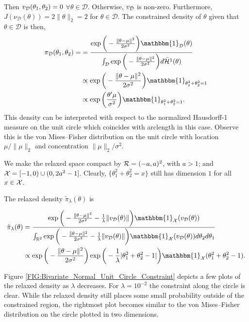 \documentclass[10pt,fleqn]{article} \pdfoutput=1
\DeclareMathOperator{\1}{\mathbbm{1}} \DeclareMathOperator{\bigO}{\mc O}
\begin{document}
Then $v_{\mathcal{D}}(\theta_1,\theta_2) = 0$ $\forall
\theta\in\mathcal{D}$. Otherwise, $v_{\mathcal{D}}$ is non-zero.  Furthermore,
$J(\nu_\mathcal{D}(\theta)) =
2\|\theta\|_2 = 2$ for $\theta\in\mathcal{D}.$ The constrained
density of $\theta$ given that $\theta\in \mathcal{D}$ is then,
\begin{align*} \pi_\mathcal{D}(\theta_1,\theta_2)=
& =
\frac{\exp\bigg(-\frac{\|\theta-\mu\|^2}{2\sigma^2}\bigg)\mathbbm{1}_\mathcal{D}(\theta)}{\int_\mathcal{D}
\exp\bigg(-\frac{\|\theta-\mu\|^2}{2\sigma^2}\bigg)d\bar{\mathcal{H}}^{1}(\theta)
}                                                              \\
& \propto \exp\bigg(-\frac{\|\theta-\mu\|^2}{2\sigma^2}\bigg)
\mathbbm{1}_{\theta_1^2 + \theta_2^2 = 1}                      \\ &\propto \exp\bigg(
\frac{\theta'\mu}{\sigma^2}\bigg) \mathbbm{1}_{\theta_1^2 + \theta_2^2
= 1}
.\end{align*} This density can be interpreted with respect to the normalized
Hausdorff-1 measure on the unit circle which coincides with arclength in
this case. Observe this is the von Mises--Fisher distribution on the unit
circle with location $\mu /\|\mu\|_2$ and concentration $\|\mu\|_2/\sigma^2$.

We make the relaxed space compact by $\mathcal{R}=(-a,a)^2$, with $a> 1$; and $\mathcal{X}=[-1,0)\cup(0,2a^2-1]$. Clearly, $\{\theta_1^2+\theta_2^2=x\}$ still has
dimension $1$ for all $x\in \mathcal{X}$.

The relaxed density $\tilde{\pi}_\lambda(\theta)$ is

\begin{equation} \begin{split} \tilde{\pi}_\lambda(\theta)
&=\frac{\exp\bigg(-\frac{\|\theta-\mu\|^2}{2\sigma^2} -
\frac{1}{\lambda}\|v_{\mc
D}(\theta)\| \bigg) \mathbbm{1}_{\mc
X}(v_{\mc D}(\theta)) }{\int_{\mathbb{R}^2}
\exp\bigg(-\frac{\|\theta-\mu\|^2}{2\sigma^2}-\frac{1}{\lambda}\|v_{\mc
D}(\theta)\|
\bigg)	\mathbbm{1}_{\mc X}(v_{\mc D}(\theta))
d\theta_2d\theta_1}
\\ & \propto
\exp\bigg(-\frac{\|\theta-\mu\|^2}{2\sigma^2}\bigg)\exp\bigg(
- \frac{1}{\lambda}|\theta_1^2+\theta_2^2-1| \bigg)
\mathbbm{1}_{\mc X}(\theta_1^2+\theta_2^2-1).  \end{split}
\label{EQ:Relaxed_Density_Bivariate_Unit_Circle} \end{equation}

Figure \ref{FIG:Bivariate_Normal_Unit_Circle_Constraint} depicts a few plots
of the relaxed density as $\lambda$ decreases.  For $\lambda=10^{-2}$ the
constraint along the circle is clear. While the relaxed density still places
some small probability outside of the constrained region, the rightmost
plot becomes similar to the von Mises--Fisher distribution on the circle plotted in
two dimensions.
\end{document}
